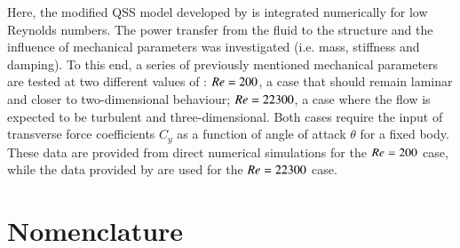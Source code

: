 Here, the modified QSS model developed by \citet{Joly2012} is integrated numerically for low Reynolds numbers. The power transfer from the fluid to the structure and the influence of mechanical parameters was investigated (i.e. mass, stiffness and damping). To this end, a series of previously mentioned mechanical parameters are tested at two different values of \reynoldsnumber: $Re = 200$, a case that should remain laminar and closer to two-dimensional behaviour; $Re = 22300$, a case where the flow is expected to be turbulent and three-dimensional. Both cases require the input of transverse force coefficients $C_y$ as a function of angle of attack $\theta$ for a fixed body. These data are provided from direct numerical simulations for the $Re = 200$ case, while the data provided by \citet{Parkinson1964} are used for the $Re = 22300$ case.

\section*{Nomenclature}

